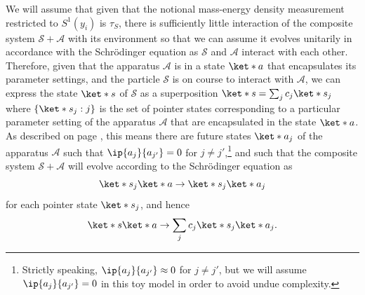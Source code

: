 \documentclass[12pt]{report}
\begin{document}
We will assume that given that the notional mass-energy density measurement restricted to $S^1(y_i)$ is $\tau_S$, there is sufficiently little interaction of the composite system $\mathcal{S}+\mathcal{A}$ with its environment so that we can assume it evolves unitarily in accordance with the Schr\"{o}dinger equation as $\mathcal{S}$ and $\mathcal{A}$ interact with each other. Therefore, given that the apparatus $\mathcal{A}$ is in a state $\ket*{a}$ that encapsulates its parameter settings, and the particle $\mathcal{S}$ is on course to interact with $\mathcal{A}$, we can express the state $\ket*{s}$ of $\mathcal{S}$ as a superposition $\ket*{s}=\sum_j c_j \ket*{s_j}$ where $\{\ket*{s_j}:j\}$ %
%
 is the set of pointer states corresponding to a particular parameter setting of the apparatus $\mathcal{A}$ that are encapsulated in the state $\ket*{a}$. As described on page \pageref{pointer}, this means there are future states $\ket*{a_j}$  %
%
of the apparatus $\mathcal{A}$ such that $\ip{a_j}{a_{j'}}=0$ for $j\neq j'$,\footnote{Strictly speaking, $\ip{a_j}{a_{j'}}\approx 0$ for $j\neq j'$, but we will assume $\ip{a_j}{a_{j'}}=0$ in this toy model in order to avoid undue complexity.} and such that the composite system $\mathcal{S}+\mathcal{A}$ will evolve according to the Schr\"{o}dinger equation as
$$\ket*{s_j}\ket*{a}\rightarrow \ket*{s_j}\ket*{a_j} $$
for each pointer state $\ket*{s_j}$, and hence
\begin{equation}\label{saevolution}
\ket*{s}\ket*{a}\rightarrow \sum_j c_j \ket*{s_j}\ket*{a_j}.
\end{equation}
\end{document}

